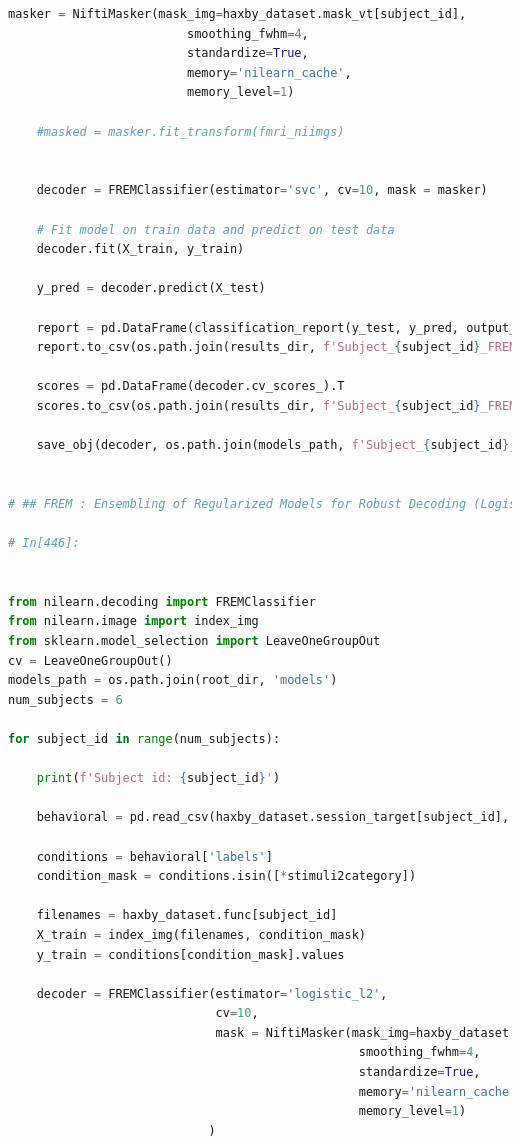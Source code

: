 \documentclass[10pt, twocolumn, letterpaper]{article}
\begin{document}
\begin{lstlisting}[language=Python]
    masker = NiftiMasker(mask_img=haxby_dataset.mask_vt[subject_id],
                         smoothing_fwhm=4,
                         standardize=True,
                         memory='nilearn_cache',
                         memory_level=1)

    #masked = masker.fit_transform(fmri_niimgs)
    
    
    decoder = FREMClassifier(estimator='svc', cv=10, mask = masker)

    # Fit model on train data and predict on test data
    decoder.fit(X_train, y_train)

    y_pred = decoder.predict(X_test)
    
    report = pd.DataFrame(classification_report(y_test, y_pred, output_dict = True)).T      
    report.to_csv(os.path.join(results_dir, f'Subject_{subject_id}_FREM_results.csv')) 
    
    scores = pd.DataFrame(decoder.cv_scores_).T
    scores.to_csv(os.path.join(results_dir, f'Subject_{subject_id}_FREMCV_results.csv')) 
    
    save_obj(decoder, os.path.join(models_path, f'Subject_{subject_id}_FREM_model'))   


# ## FREM : Ensembling of Regularized Models for Robust Decoding (Logistic Regression - L2)

# In[446]:


from nilearn.decoding import FREMClassifier
from nilearn.image import index_img
from sklearn.model_selection import LeaveOneGroupOut
cv = LeaveOneGroupOut()  
models_path = os.path.join(root_dir, 'models')
num_subjects = 6

for subject_id in range(num_subjects):
    
    print(f'Subject id: {subject_id}')

    behavioral = pd.read_csv(haxby_dataset.session_target[subject_id], sep=" ")

    conditions = behavioral['labels']
    condition_mask = conditions.isin([*stimuli2category]) 
    
    filenames = haxby_dataset.func[subject_id]
    X_train = index_img(filenames, condition_mask)  
    y_train = conditions[condition_mask].values
    
    decoder = FREMClassifier(estimator='logistic_l2',
                             cv=10,
                             mask = NiftiMasker(mask_img=haxby_dataset.mask_vt[subject_id],
                                                 smoothing_fwhm=4,
                                                 standardize=True,
                                                 memory='nilearn_cache',
                                                 memory_level=1)
                            )


\end{lstlisting}
\end{document}
